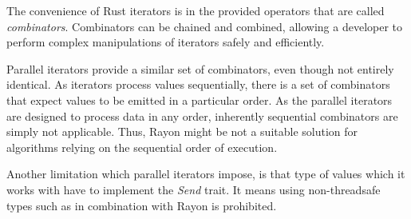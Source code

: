 The convenience of Rust iterators is in the provided operators that are called \emph{combinators}. Combinators can be chained and combined, allowing a developer to perform complex manipulations of iterators safely and efficiently. 

Parallel iterators provide a similar set of combinators, even though not entirely identical. As iterators process values sequentially, there is a set of combinators that expect values to be emitted in a particular order. As the parallel iterators are designed to process data in any order, inherently sequential combinators are simply not applicable. Thus, Rayon might be not a suitable solution for algorithms relying on the sequential order of execution.

Another limitation which parallel iterators impose, is that type of values which it works with have to implement the \emph{Send} trait. It means using non-threadsafe types such as \rc{} in combination with Rayon is prohibited. 


